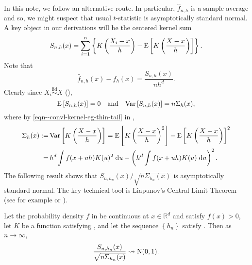 In this note, we follow an alternative route.
In particular, \(\widehat{f}_{n, h}\) is a sample average and so,
we might suspect that usual \(t\)-statistic is asymptotically standard normal.
A key object in our derivations will be the centered kernel sum
\begin{equation}
  S_{n, h} (x) = \sum_{i = 1}^{n} \left\{ K \left( \frac{X_{i} - x}{h} \right) -
  \mathrm{E} \left[ K \left( \frac{X - x}{h} \right) \right] \right\}.
  \label{eqn--kernel-sum}
\end{equation}
Note that
\begin{equation}
  \widehat{f}_{n, h} (x) - f_{h} (x) = \frac{S_{n, h} (x)}{n h^{d}}.
  \label{eqn--fhat-diff-to-kernel-sum}
\end{equation}
Clearly since \(X_{i} \overset{\mathrm{iid}}{\sim} X\) (),
\begin{equation}
  \mathrm{E} \left[ S_{n, h} (x) \right] = 0 \quad \text{and} \quad \mathrm{Var}
  \left[ S_{n, h} (x) \right] = n \Sigma_{h} (x),
  \label{eqn--kernel-sum-mean-and-var}
\end{equation}
where by \eqref{eqn--convl-kernel-eg-thin-tail} in
,
\begin{equation}
  \begin{split}
    \Sigma_{h} (x) :=
    & \, \mathrm{Var} \left[ K \left( \frac{X - x}{h} \right) \right] = \mathrm{E}
    \left[ K \left( \frac{X - x}{h} \right)^{2} \right] - \mathrm{E} \left[ K \left(
    \frac{X - x}{h} \right) \right]^{2} \\
    =
    & \, h^{d} \int f (x + u h) K (u)^{2} \; \mathrm{d} u
    - \left( h^{d} \int f (x + u h) K (u) \; \mathrm{d} u \right)^{2}.
  \end{split}
  \label{eqn--Sigmah-expand}
\end{equation}
The following result shows that \(S_{n, h_{n}} (x) / \sqrt{n \Sigma_{h_{n}}
(x)}\) is asymptotically standard normal.
The key technical tool is Liapunov's Central Limit Theorem (see for example
\citet[Theorem 27.3, p. 362]{1995billingsleyProbabilityMeasure}
or \citet[Theorem 18 in Section 4 of Chapter III,
p. 51]{1984pollardConvergenceStochasticProcesses}).

\begin{theorem}
\label{thm--kernel-sum-asymp-norm}
Let the probability density \(f\) in  be continuous at \(x
\in \mathbb{R}^{d}\) and satisfy \(f (x) > 0\), let \(K\) be a function
satisfying , and let the sequence \(\left\{ h_{n} \right\}\)
satisfy .
Then as \(n \to \infty\),
\begin{equation}
  \frac{S_{n, h_{n}} (x)}{\sqrt{n \Sigma_{h_{n}} (x)}} \rightsquigarrow \mathrm{N} (0,
  1).
  \label{eqn--kernel-sum-asymp-norm}
\end{equation}
\end{theorem}

